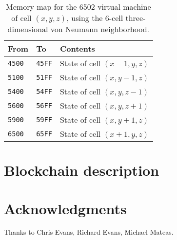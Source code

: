 \documentclass{article}
\newcommand\memtable[1]{
\begin{tabular}{lll}
  \hline
  From & To & Contents \\
  \hline
  #1
  \hline
\end{tabular}
}
\newcommand\memrow[4]{
    {\tt {#1}00} & {\tt {#1}FF} & State of cell $(x#2,y#3,z#4)$ \\
}
\newcommand\vonneumannmap{\memtable{
  \memrow{45}{-1}{}{}
  \memrow{51}{}{-1}{}
  \memrow{54}{}{}{-1}
  \memrow{56}{}{}{+1}
  \memrow{59}{}{+1}{}
  \memrow{65}{+1}{}{}
}}
\begin{document}
\begin{table}
\vonneumannmap
\caption{
  \label{tab:VonNeumannNeighborhood}
  Memory map for the 6502 virtual machine of cell $(x,y,z)$,
  using the 6-cell three-dimensional von Neumann neighborhood.
}
\end{table}





\section{Blockchain description}

\cite{Nakamoto2008}

\section*{Acknowledgments}
Thanks to Chris Evans, Richard Evans, Michael Mateas.



\end{document}
